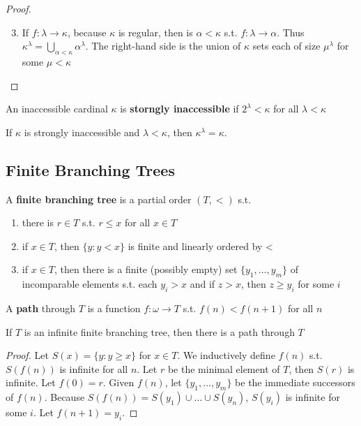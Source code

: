 \documentclass[11pt]{article}
\begin{document}
\begin{proof}
\begin{enumerate}
\setcounter{enumi}{2}
\item If \(f:\lambda\to\kappa\), because \(\kappa\) is regular, then is \(\alpha<\kappa\) s.t. \(f:\lambda\to\alpha\). Thus
\(\kappa^\lambda=\bigcup_{\alpha<\kappa}\alpha^\lambda\). The right-hand side is the union of \(\kappa\) sets each of size \(\mu^\lambda\) for some \(\mu<\kappa\)
\end{enumerate}
\end{proof}

An inaccessible cardinal \(\kappa\) is \textbf{storngly inaccessible} if \(2^\lambda<\kappa\) for all \(\lambda<\kappa\)

\begin{corollary}[]
If \(\kappa\) is strongly inaccessible and \(\lambda<\kappa\), then \(\kappa^\lambda=\kappa\).
\end{corollary}
\subsection{Finite Branching Trees}
\label{sec:orgc1f488c}
\begin{definition}[]
A \textbf{finite branching tree} is a partial order \((T,<)\) s.t.
\begin{enumerate}
\item there is \(r\in T\) s.t. \(r\le x\) for all \(x\in T\)
\item if \(x\in T\), then \(\{y:y<x\}\) is finite and linearly ordered by <
\item if \(x\in T\), then there is a finite (possibly empty) set \(\{y_1,\dots,y_m\}\) of incomparable
elements s.t. each \(y_i>x\) and if \(z>x\), then \(z\ge y_i\) for some \(i\)
\end{enumerate}
\end{definition}

A \textbf{path} through \(T\) is a function \(f:\omega\to T\) s.t. \(f(n)<f(n+1)\) for all \(n\)

\begin{lemma}
\label{lemmaA.21}
If \(T\) is an infinite finite branching tree, then there is a path through \(T\)
\end{lemma}

\begin{proof}
Let \(S(x)=\{y:y\ge x\}\) for \(x\in T\). We inductively define \(f(n)\) s.t. \(S(f(n))\) is infinite
for all \(n\). Let \(r\) be the minimal element of \(T\), then \(S(r)\) is infinite.
Let \(f(0)=r\). Given \(f(n)\), let \(\{y_1,\dots,y_m\}\) be the immediate successors of \(f(n)\).
Because \(S(f(n))=S(y_1)\cup\dots\cup S(y_n)\), \(S(y_i)\) is infinite for some \(i\). Let \(f(n+1)=y_i\).
\end{proof}
\end{document}
